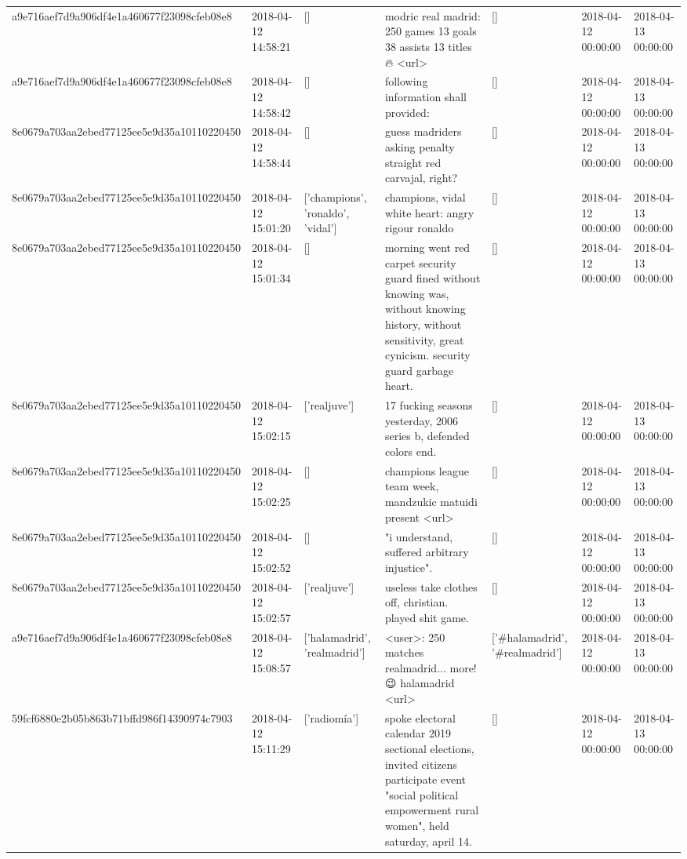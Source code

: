 \begin{tabular}{lllllll}
a9e716aef7d9a906df4e1a460677f23098cfeb08e8 & 2018-04-12 14:58:21 & [] & modric real madrid: 250 games 13 goals 38 assists 13 titles 🔥 <url> & [] & 2018-04-12 00:00:00 & 2018-04-13 00:00:00 \\
a9e716aef7d9a906df4e1a460677f23098cfeb08e8 & 2018-04-12 14:58:42 & [] & following information shall provided: & [] & 2018-04-12 00:00:00 & 2018-04-13 00:00:00 \\
8e0679a703aa2ebed77125ee5e9d35a10110220450 & 2018-04-12 14:58:44 & [] & guess madriders asking penalty straight red carvajal, right? & [] & 2018-04-12 00:00:00 & 2018-04-13 00:00:00 \\
8e0679a703aa2ebed77125ee5e9d35a10110220450 & 2018-04-12 15:01:20 & ['champions', 'ronaldo', 'vidal'] & champions, vidal white heart: angry rigour ronaldo & [] & 2018-04-12 00:00:00 & 2018-04-13 00:00:00 \\
8e0679a703aa2ebed77125ee5e9d35a10110220450 & 2018-04-12 15:01:34 & [] & morning went red carpet security guard fined without knowing was, without knowing history, without sensitivity, great cynicism. security guard garbage heart. & [] & 2018-04-12 00:00:00 & 2018-04-13 00:00:00 \\
8e0679a703aa2ebed77125ee5e9d35a10110220450 & 2018-04-12 15:02:15 & ['realjuve'] & 17 fucking seasons yesterday, 2006 series b, defended colors end. & [] & 2018-04-12 00:00:00 & 2018-04-13 00:00:00 \\
8e0679a703aa2ebed77125ee5e9d35a10110220450 & 2018-04-12 15:02:25 & [] & champions league team week, mandzukic matuidi present <url> & [] & 2018-04-12 00:00:00 & 2018-04-13 00:00:00 \\
8e0679a703aa2ebed77125ee5e9d35a10110220450 & 2018-04-12 15:02:52 & [] & "i understand, suffered arbitrary injustice". & [] & 2018-04-12 00:00:00 & 2018-04-13 00:00:00 \\
8e0679a703aa2ebed77125ee5e9d35a10110220450 & 2018-04-12 15:02:57 & ['realjuve'] & useless take clothes off, christian. played shit game. & [] & 2018-04-12 00:00:00 & 2018-04-13 00:00:00 \\
a9e716aef7d9a906df4e1a460677f23098cfeb08e8 & 2018-04-12 15:08:57 & ['halamadrid', 'realmadrid'] & <user>: 250 matches realmadrid... more! 😉 halamadrid <url> & ['#halamadrid', '#realmadrid'] & 2018-04-12 00:00:00 & 2018-04-13 00:00:00 \\
59fcf6880e2b05b863b71bffd986f14390974c7903 & 2018-04-12 15:11:29 & ['radiomía'] & spoke electoral calendar 2019 sectional elections, invited citizens participate event "social political empowerment rural women", held saturday, april 14. & [] & 2018-04-12 00:00:00 & 2018-04-13 00:00:00 \\

\end{tabular}
